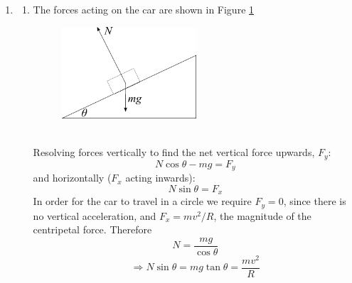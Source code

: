 \begin{problem}
{\begin{enumerate}
The condition for circular motion is
\begin{equation*}
F=mv^2/R
\end{equation*}
since the frictional force $\vtr{F}$ is the only force acting in the horizontal direction. Resolving vertically gives
\begin{equation*}
N=mg
\end{equation*}
and we know that $F=\mu N$ on the point of slipping, therefore
\begin{equation*}
\mu N=\mu mg=mv^2/R
\end{equation*}
\begin{equation*}
\Rightarrow v^2=\mu gR
\end{equation*} therefore
\begin{equation*}
v\le\sqrt{\mu gR}
\end{equation*}
for the car not to slip. 
\\
\item
\begin{enumerate}
\item The forces acting on the car are shown in Figure \ref{fig:CircularMotion_d}
\begin{figure}[h]
\centering
\includegraphics[width=5cm]{CircularMotion_d}
\caption{}
\label{fig:CircularMotion_d}
\end{figure}
\\
Resolving forces vertically to find the net vertical force upwards, $F_y$:
\begin{equation*} N\cos\theta-mg=F_y \end{equation*}
and horizontally ($F_x$ acting inwards):
\begin{equation*} N\sin\theta=F_x \end{equation*}
In order for the car to travel in a circle we require $F_y=0$, since there is no vertical acceleration, and $F_x=mv^2/R$, the magnitude of the centripetal force. Therefore
\begin{equation*} N=\frac{mg}{\cos\theta} \end{equation*}
\begin{equation*} \Rightarrow N\sin\theta=mg\tan\theta=\frac{mv^2}{R} \end{equation*}

\end{enumerate}
\end{enumerate}}
\end{problem}
